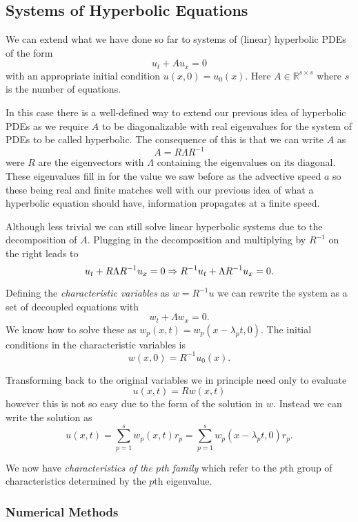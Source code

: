 \documentclass[11pt]{article}
\begin{document}
    \hypertarget{systems-of-hyperbolic-equations}{%
\subsection{Systems of Hyperbolic
Equations}\label{systems-of-hyperbolic-equations}}

We can extend what we have done so far to systems of (linear) hyperbolic
PDEs of the form \[
    u_t + A u_x = 0
\] with an appropriate initial condition \(u(x,0) = u_0(x)\). Here
\(A \in \mathbb R^{s \times s}\) where \(s\) is the number of equations.

    In this case there is a well-defined way to extend our previous idea of
hyperbolic PDEs as we require \(A\) to be diagonalizable with real
eigenvalues for the system of PDEs to be called hyperbolic. The
consequence of this is that we can write \(A\) as \[
    A = R \Lambda R^{-1}
\] were \(R\) are the eigenvectors with \(\Lambda\) containing the
eigenvalues on its diagonal. These eigenvalues fill in for the value we
saw before as the advective speed \(a\) so these being real and finite
matches well with our previous idea of what a hyperbolic equation should
have, information propagates at a finite speed.

    Although less trivial we can still solve linear hyperbolic systems due
to the decomposition of \(A\). Plugging in the decomposition and
multiplying by \(R^{-1}\) on the right leads to \[
    u_t + R \Lambda R^{-1} u_x = 0 \Rightarrow \\
    R^{-1} u_t + \Lambda R^{-1} u_x = 0.
\]

    Defining the \emph{characteristic variables} as \(w = R^{-1} u\) we can
rewrite the system as a set of decoupled equations with \[
    w_t + \Lambda w_x = 0.
\] We know how to solve these as \(w_p(x,t) = w_p(x - \lambda_p t, 0)\).
The initial conditions in the characteristic variables is \[
    w(x, 0) = R^{-1} u_0(x).
\]

    Transforming back to the original variables we in principle need only to
evaluate \[
    u(x,t) = R w(x,t)
\] however this is not so easy due to the form of the solution in \(w\).
Instead we can write the solution as \[
    u(x,t) = \sum^s_{p=1} w_p(x,t) r_p = \sum^s_{p=1}w_p(x - \lambda_p t, 0) r_p.
\]

We now have \emph{characteristics of the \(p\)th family} which refer to
the \(p\)th group of characteristics determined by the \(p\)th
eigenvalue.

    \hypertarget{numerical-methods}{%
\subsubsection{Numerical Methods}\label{numerical-methods}}
\end{document}
